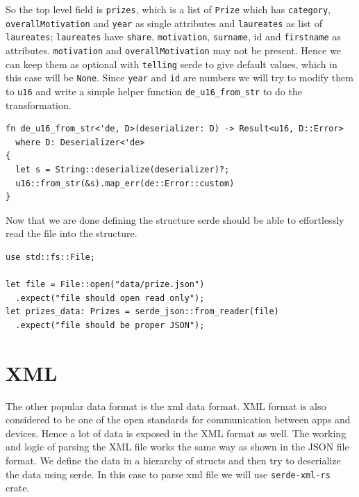 \documentclass{book}
\begin{document}
So the top level field is \lstinline{prizes}, which is a list of \lstinline{Prize} which has \lstinline{category}, \lstinline{overallMotivation} and \lstinline{year} as single attributes and \lstinline{laureates} as list of \lstinline{laureates}; \lstinline{laureates} have \lstinline{share}, \lstinline{motivation}, \lstinline{surname}, id and \lstinline{firstname} as attributes. \lstinline{motivation} and \lstinline{overallMotivation} may not be present. Hence we can keep them as optional with \lstinline{telling} serde to give default values, which in this case will be \lstinline{None}. Since \lstinline{year} and \lstinline{id} are numbers we will try to modify them to \lstinline{u16} and write a simple helper function \lstinline{de_u16_from_str} to do the transformation.

\begin{lstlisting}[caption={chapter4\\/working\_with\_data\\/data\_formats\\/src\\/jsonreading\\.rs},basicstyle=\small]
fn de_u16_from_str<'de, D>(deserializer: D) -> Result<u16, D::Error>
  where D: Deserializer<'de>
{
  let s = String::deserialize(deserializer)?;
  u16::from_str(&s).map_err(de::Error::custom)
}
\end{lstlisting}

Now that we are done defining the structure serde should be able to effortlessly read the file into the structure.

\begin{lstlisting}[caption={chapter4\\/working\_with\_data\\/data\_formats\\/src\\/jsonreading\\.rs},basicstyle=\small]
use std::fs::File;

let file = File::open("data/prize.json")
  .expect("file should open read only");
let prizes_data: Prizes = serde_json::from_reader(file)
  .expect("file should be proper JSON");
\end{lstlisting}
\label{sec:json}

\section{XML}%
The other popular data format is the xml data format. XML format is also considered to be one of the open standards for communication between apps and devices. Hence a lot of data is exposed in the XML format as well. The working and logic of parsing the XML file works the same way as shown in the JSON file format. We define the data in a hierarchy of structs and then try to deserialize the data using serde. In this case to parse xml file we will use \lstinline{serde-xml-rs} crate.
\end{document}
